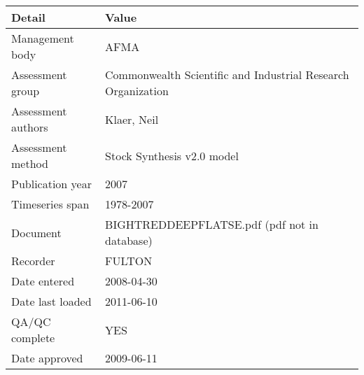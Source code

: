 \begin{table}[htb]
\centering
\begin{tabular}{lp{7cm}}
\toprule
Detail & Value \\
\midrule
Management body    & AFMA                                                         \\
Assessment group   & Commonwealth Scientific and Industrial Research Organization \\
Assessment authors & Klaer, Neil                                                  \\
Assessment method  & Stock Synthesis v2.0 model                                   \\
Publication year   & 2007                                                         \\
Timeseries span    & 1978-2007                                                    \\
Document           & BIGHTREDDEEPFLATSE.pdf (pdf not in database)                 \\
Recorder           & FULTON                                                       \\
Date entered       & 2008-04-30                                                   \\
Date last loaded   & 2011-06-10                                                   \\
QA/QC complete     & YES                                                          \\
Date approved      & 2009-06-11                                                   \\
\bottomrule
\end{tabular}
\label{tab:assessdet}
\end{table}
